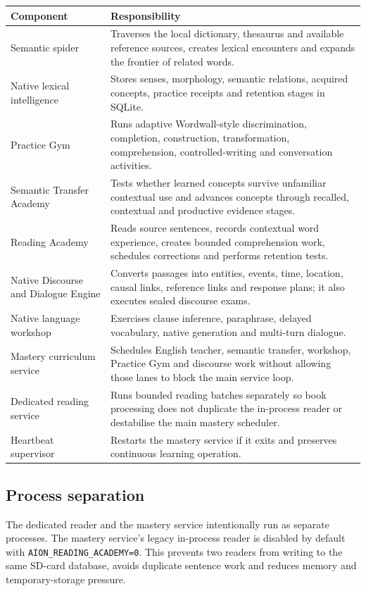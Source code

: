 \documentclass[11pt,a4paper]{article}
\begin{document}
\begin{longtable}{p{} p{}}
\toprule
Component & Responsibility \\
\midrule
\endhead
Semantic spider & Traverses the local dictionary, thesaurus and available reference sources,
creates lexical encounters and expands the frontier of related words. \\
Native lexical intelligence & Stores senses, morphology, semantic relations, acquired concepts,
practice receipts and retention stages in SQLite. \\
Practice Gym & Runs adaptive Wordwall-style discrimination, completion, construction,
transformation, comprehension, controlled-writing and conversation activities. \\
Semantic Transfer Academy & Tests whether learned concepts survive unfamiliar contextual use
and advances concepts through recalled, contextual and productive evidence stages. \\
Reading Academy & Reads source sentences, records contextual word experience, creates bounded
comprehension work, schedules corrections and performs retention tests. \\
Native Discourse and Dialogue Engine & Converts passages into entities, events, time, location,
causal links, reference links and response plans; it also executes sealed discourse exams. \\
Native language workshop & Exercises clause inference, paraphrase, delayed vocabulary, native
generation and multi-turn dialogue. \\
Mastery curriculum service & Schedules English teacher, semantic transfer, workshop, Practice
Gym and discourse work without allowing those lanes to block the main service loop. \\
Dedicated reading service & Runs bounded reading batches separately so book processing does not
duplicate the in-process reader or destabilise the main mastery scheduler. \\
Heartbeat supervisor & Restarts the mastery service if it exits and preserves continuous
learning operation. \\
\bottomrule
\end{longtable}

\subsection{Process separation}

The dedicated reader and the mastery service intentionally run as separate processes. The
mastery service's legacy in-process reader is disabled by default with
\texttt{AION\_READING\_ACADEMY=0}. This prevents two readers from writing to the same SD-card
database, avoids duplicate sentence work and reduces memory and temporary-storage pressure.
\end{document}
